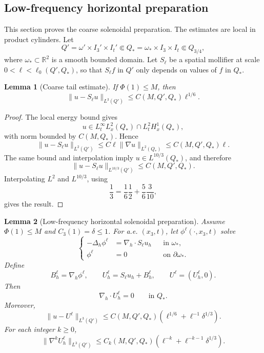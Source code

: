 \documentclass[11pt]{article}
\numberwithin{equation}{section}
\theoremstyle{plain}
\newtheorem{lemma}{Lemma}[section]
\theoremstyle{definition}
\theoremstyle{remark}
\newcommand{\R}{\mathbb R}
\newcommand{\nabh}{\nabla_h}
\newcommand{\divh}{\nabla_h\!\cdot}
\begin{document}
\subsection{Low-frequency horizontal preparation}\label{pI:sec:preparation}

This section proves the coarse solenoidal preparation.  The estimates are local in product cylinders.  Let
\[
        Q'=\omega'\times I_3'\times I_t'
        \Subset
        Q_*=\omega_*\times I_3\times I_t
        \Subset Q_{3/4},
\]
where \(\omega_*\subset\R^2\) is a smooth bounded domain.  Let \(S_\ell\) be a spatial mollifier at scale \(0<\ell<\ell_0(Q',Q_*)\), so that \(S_\ell f\) in \(Q'\) only depends on values of \(f\) in \(Q_*\).

\begin{lemma}[Coarse tail estimate]\label{pI:lem:coarse-tail}
If \(\Phi(1)\le M\), then
\[
        \|u-S_\ell u\|_{L^3(Q')}
        \le C(M,Q',Q_*)\ell^{1/6}.
\]
\end{lemma}

\begin{proof}
The local energy bound gives
\[
        u\in L_t^\infty L_x^2(Q_*)\cap L_t^2H_x^1(Q_*),
\]
with norm bounded by \(C(M,Q_*)\).  Hence
\[
        \|u-S_\ell u\|_{L^2(Q')}
        \le C\ell\|\nabla u\|_{L^2(Q_*)}
        \le C(M,Q',Q_*)\ell.
\]
The same bound and interpolation imply \(u\in L^{10/3}(Q_*)\), and therefore
\[
        \|u-S_\ell u\|_{L^{10/3}(Q')}
        \le C(M,Q',Q_*).
\]
Interpolating \(L^2\) and \(L^{10/3}\), using
\[
        \frac13=\frac16\frac12+\frac56\frac3{10},
\]
gives the result.
\end{proof}

\begin{lemma}[Low-frequency horizontal solenoidal preparation]\label{pI:lem:low-frequency-horizontal-preparation}
Assume \(\Phi(1)\le M\) and \(C_3(1)=\delta\le1\).  For a.e. \((x_3,t)\), let \(\phi^\ell(\cdot,x_3,t)\) solve
\[
\left\{
\begin{aligned}
        -\Delta_h\phi^\ell&=\divh S_\ell u_h
        &&\text{in }\omega_*,\\
        \phi^\ell&=0
        &&\text{on }\partial\omega_*.
\end{aligned}
\right.
\]
Define
\[
        B_h^\ell=\nabh\phi^\ell,
        \qquad
        U_h^\ell=S_\ell u_h+B_h^\ell,
        \qquad
        U^\ell=(U_h^\ell,0).
\]
Then
\[
        \divh U_h^\ell=0\qquad\text{in }Q_*.
\]
Moreover,
\begin{equation}\label{pI:eq:sol-prep-L3}
        \|u-U^\ell\|_{L^3(Q')}
        \le C(M,Q',Q_*)
        \left(\ell^{1/6}+\ell^{-1}\delta^{1/3}\right).
\end{equation}
For each integer \(k\ge0\),
\begin{equation}\label{pI:eq:sol-prep-high}
        \|\nabla^kU_h^\ell\|_{L^3(Q')}
        \le C_k(M,Q',Q_*)
        \left(\ell^{-k}+\ell^{-k-1}\delta^{1/3}\right).
\end{equation}
\end{lemma}
\end{document}
